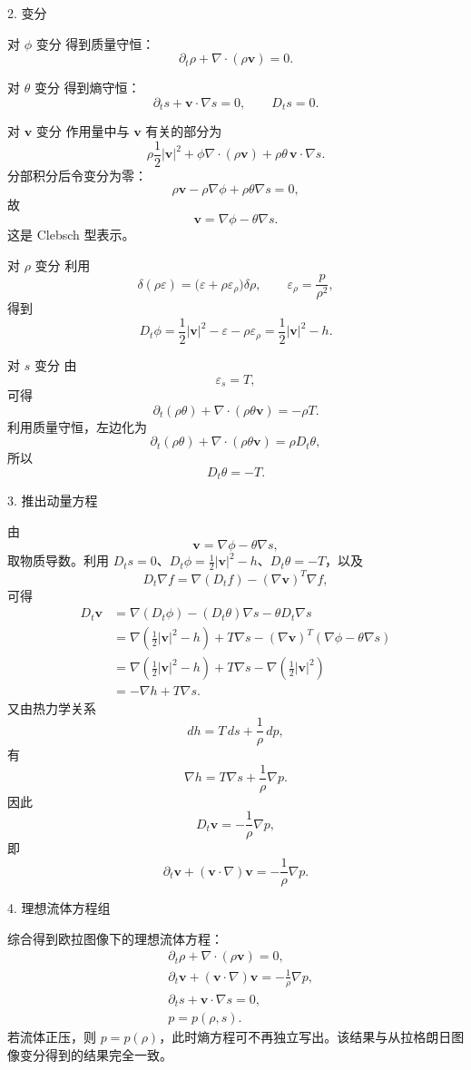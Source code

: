 \documentclass[b5paper]{book}
\begin{document}
 2. 变分

 对 \(\phi\) 变分
得到质量守恒：
\[
\partial_t\rho+\nabla\cdot(\rho\boldsymbol v)=0.
\]

 对 \(\theta\) 变分
得到熵守恒：
\[
\partial_t s+\boldsymbol v\cdot\nabla s=0,
\qquad D_t s=0.
\]

 对 \(\boldsymbol v\) 变分
作用量中与 \(\boldsymbol v\) 有关的部分为
\[
\rho\frac12|\boldsymbol v|^2
+\phi\nabla\cdot(\rho\boldsymbol v)
+\rho\theta\,\boldsymbol v\cdot\nabla s.
\]
分部积分后令变分为零：
\[
\rho\boldsymbol v-\rho\nabla\phi+\rho\theta\nabla s=0,
\]
故
\[
\boldsymbol v=\nabla\phi-\theta\nabla s.
\]
这是 Clebsch 型表示。

 对 \(\rho\) 变分
利用
\[
\delta(\rho\varepsilon)=\bigl(\varepsilon+\rho\varepsilon_\rho\bigr)\delta\rho,
\qquad
\varepsilon_\rho=\frac{p}{\rho^2},
\]
得到
\[
D_t\phi=\frac12|\boldsymbol v|^2-\varepsilon-\rho\varepsilon_\rho
=\frac12|\boldsymbol v|^2-h.
\]

 对 \(s\) 变分
由
\[
\varepsilon_s=T,
\]
可得
\[
\partial_t(\rho\theta)+\nabla\cdot(\rho\theta\boldsymbol v)=-\rho T.
\]
利用质量守恒，左边化为
\[
\partial_t(\rho\theta)+\nabla\cdot(\rho\theta\boldsymbol v)
=\rho D_t\theta,
\]
所以
\[
D_t\theta=-T.
\]

3. 推出动量方程

由
\[
\boldsymbol v=\nabla\phi-\theta\nabla s,
\]
取物质导数。利用 \(D_t s=0\)、\(D_t\phi=\frac12|\boldsymbol v|^2-h\)、\(D_t\theta=-T\)，以及
\[
D_t\nabla f=\nabla(D_t f)-(\nabla\boldsymbol v)^T\nabla f,
\]
可得
\[
\begin{aligned}
D_t\boldsymbol v
&=
\nabla(D_t\phi)-(D_t\theta)\nabla s-\theta D_t\nabla s\\
&=
\nabla\left(\frac12|\boldsymbol v|^2-h\right)+T\nabla s
-(\nabla\boldsymbol v)^T(\nabla\phi-\theta\nabla s)\\
&=
\nabla\left(\frac12|\boldsymbol v|^2-h\right)+T\nabla s-\nabla\left(\frac12|\boldsymbol v|^2\right)\\
&=-\nabla h+T\nabla s.
\end{aligned}
\]
又由热力学关系
\[
dh=T\,ds+\frac{1}{\rho}\,dp,
\]
有
\[
\nabla h=T\nabla s+\frac{1}{\rho}\nabla p.
\]
因此
\[
D_t\boldsymbol v=-\frac{1}{\rho}\nabla p,
\]
即
\[
\partial_t\boldsymbol v+(\boldsymbol v\cdot\nabla)\boldsymbol v
=-\frac{1}{\rho}\nabla p.
\]

4. 理想流体方程组

综合得到欧拉图像下的理想流体方程：
\[
\boxed{
\begin{aligned}
&\partial_t\rho+\nabla\cdot(\rho\boldsymbol v)=0,\\[1mm]
&\partial_t\boldsymbol v+(\boldsymbol v\cdot\nabla)\boldsymbol v
=-\frac{1}{\rho}\nabla p,\\[1mm]
&\partial_t s+\boldsymbol v\cdot\nabla s=0,\\[1mm]
&p=p(\rho,s).
\end{aligned}}
\]
若流体正压，则 \(p=p(\rho)\)，此时熵方程可不再独立写出。该结果与从拉格朗日图像变分得到的结果完全一致。
\end{document}
